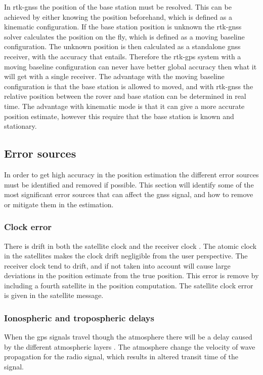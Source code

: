 In \gls{rtk-gnss} the position of the base station must be resolved. This can be achieved by either knowing the position beforehand, which is defined as a kinematic configuration. If the base station position is unknown the \gls{rtk-gnss} solver calculates the position on the fly, which is defined as a moving baseline configuration. The unknown position is then calculated as a standalone \gls{gnss} receiver, with the accuracy that entails. Therefore the \gls{rtk-gps} system with a moving baseline configuration can never have better global accuracy then what it will get with a single receiver. The advantage with the moving baseline configuration is that the base station is allowed to moved, and with \gls{rtk-gnss} the relative position between the rover and base station can be determined in real time. The advantage with kinematic mode is that it can give a more accurate position estimate, however this require that the base station is known and stationary.
\subsection{Error sources}
In order to get high accuracy in the position estimation the different error sources must be identified and removed if possible. This section will identify some of the most significant error sources that can affect the \gls{gnss} signal, and how to remove or mitigate them in the estimation.
\subsubsection{Clock error}
There is drift in both the satellite clock and the receiver clock \citep{misra2011global}. The atomic clock in the satellites makes the clock drift negligible from the user perspective. The receiver clock tend to drift, and if not taken into account will cause large deviations in the position estimate from the true position. This error is remove by including a fourth satellite in the position computation. The satellite clock error is given in the satellite message.
\subsubsection{Ionospheric and tropospheric delays}\label{Ss:Atmosphere}
When the \gls{gps} signals travel though the atmosphere there will be a delay caused by the different atmospheric layers \citep{misra2011global}. The atmosphere change the velocity of wave propagation for the radio signal, which results in altered transit time of the signal.
